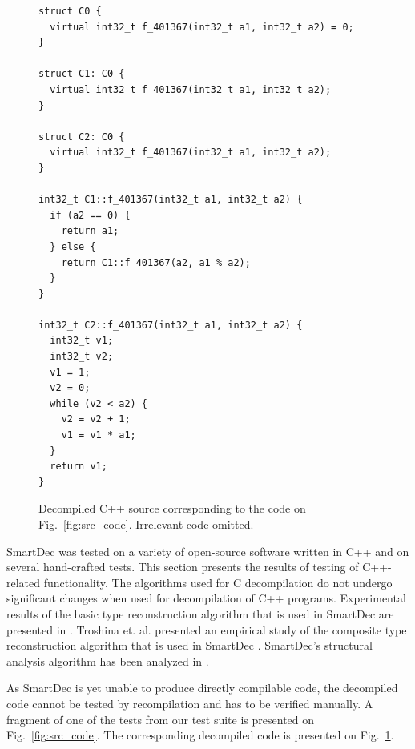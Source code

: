 \documentclass[10pt, conference, compsocconf]{IEEEtran}
\begin{document}
\begin{figure}[tb!]
\centering
{
\lstset{basicstyle=\scriptsize}
\begin{lstlisting}
struct C0 {
  virtual int32_t f_401367(int32_t a1, int32_t a2) = 0;
}

struct C1: C0 {
  virtual int32_t f_401367(int32_t a1, int32_t a2);
}

struct C2: C0 {
  virtual int32_t f_401367(int32_t a1, int32_t a2);
}

int32_t C1::f_401367(int32_t a1, int32_t a2) {
  if (a2 == 0) {
    return a1; 
  } else {
    return C1::f_401367(a2, a1 % a2);
  }
}

int32_t C2::f_401367(int32_t a1, int32_t a2) {
  int32_t v1;
  int32_t v2;
  v1 = 1;
  v2 = 0;
  while (v2 < a2) {
    v2 = v2 + 1;
    v1 = v1 * a1;
  }
  return v1;
}
\end{lstlisting}
}
\caption{Decompiled C++ source corresponding to the code on Fig.~\ref{fig:src_code}. Irrelevant code omitted.}
\label{fig:dec_code}
\end{figure}

SmartDec was tested on a variety of open-source software written in C++ and on
several hand-crafted tests. This section presents the results of testing
of C++-related functionality. The algorithms used for C decompilation do not undergo
significant changes when used for decompilation of C++ programs.
Experimental results of the basic type reconstruction algorithm that is used 
in SmartDec are presented in \cite{psi_workshop}.
Troshina et. al. presented an empirical study of the composite type reconstruction 
algorithm that is used in SmartDec \cite{scam2010}.
SmartDec's structural analysis algorithm has been analyzed in \cite{PI3_09}.

As SmartDec is yet unable to produce directly compilable code, 
the decompiled code cannot be tested by recompilation and has to be verified manually.
A fragment of one of the tests from our test suite is presented on Fig.~\ref{fig:src_code}. 
The corresponding decompiled code is presented on Fig.~\ref{fig:dec_code}.


\end{document}
